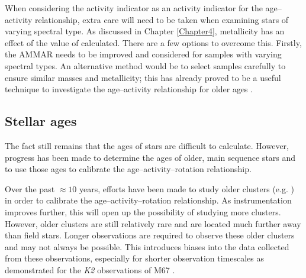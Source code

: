 When considering the \Rprime activity indicator as an activity indicator for the age--activity relationship, extra care will need to be taken when examining stars of varying spectral type. As discussed in Chapter \ref{Chapter4}, metallicity has an effect of the value of \Rprime calculated. There are a few options to overcome this. Firstly, the AMMAR \citep{Lorenzo_Oliveira_etal_2016} needs to be improved and considered for samples with varying spectral types. An alternative method would be to select samples carefully to ensure similar masses and metallicity; this has already proved to be a useful technique to investigate the age--activity relationship for older ages \citep{dos_Santos_etal_2016,Lorenzo_Oliveira_etal_2018}.

\subsection{Stellar ages}
\label{Chp6_future_ages}

The fact still remains that the ages of stars are difficult to calculate. However, progress has been made to determine the ages of older, main sequence stars and to use those ages to calibrate the age--activity--rotation relationship.

Over the past $\approx 10$ years, efforts have been made to study older clusters (e.g. \citealt{Meibom_etal_2015, Barnes_etal_2016}) in order to calibrate the  age--activity--rotation relationship. As instrumentation improves further, this will open up the possibility of studying more clusters. However, older clusters are still relatively rare and are located much further away than field stars. Longer observations are required to observe these older clusters and may not always be possible. This introduces biases into the data collected from these observations, especially for shorter observation timescales as demonstrated for the \textit{K2} observations of M67 \citep{Esselstein_etal_2018}.

